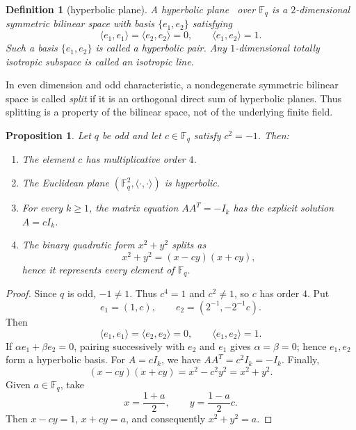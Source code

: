 \documentclass[12pt]{article}
\newtheorem{defn}{Definition}[section]
\newtheorem{prop}[theorem]{Proposition}
\newcommand{\F}{\mathbb{F}}
\begin{document}
\begin{defn}[hyperbolic plane]\label{def:hyp}
{\rm
A hyperbolic plane~\cite{Ser} over $\F_q$ is a $2$-dimensional symmetric bilinear space with basis $\{e_1,e_2\}$ satisfying
\[
\langle e_1,e_1\rangle = \langle e_2,e_2\rangle = 0,
\qquad
\langle e_1,e_2\rangle = 1.
\]
Such a basis \(\{e_1,e_2\}\) is called a hyperbolic pair. Any $1$-dimensional totally isotropic subspace is called an isotropic line.
}
\end{defn}

In even dimension and odd characteristic, a nondegenerate symmetric
bilinear space is called \emph{split} if it is an orthogonal direct sum of
hyperbolic planes. Thus splitting is a property of the bilinear space, not
of the underlying finite field.

\begin{prop}\label{prop:split-consequences}
Let \(q\) be odd and let \(c\in\F_q\) satisfy \(c^2=-1\). Then:
\begin{enumerate}[label=(\roman*)]
\item The element $c$ has multiplicative order $4$.
\item The Euclidean plane $(\F_q^2,\langle \cdot,\cdot\rangle)$ is hyperbolic.
\item For every $k \ge 1$, the matrix equation $AA^T = -I_k$ has the explicit solution $A=cI_k$.
\item The binary quadratic form $x^2+y^2$ splits as
\[
x^2+y^2 = (x-cy)(x+cy),
\]
hence it represents every element of\/ $\F_q$.
\end{enumerate}
\end{prop}

\begin{proof}
Since \(q\) is odd, \(-1\ne1\). Thus \(c^4=1\) and \(c^2\ne1\), so
\(c\) has order \(4\). Put
\[
e_1=(1,c),\qquad e_2=(2^{-1},-2^{-1}c).
\]
Then
\[
\langle e_1,e_1\rangle=\langle e_2,e_2\rangle=0,
\qquad \langle e_1,e_2\rangle=1.
\]
If \(\alpha e_1+\beta e_2=0\), pairing successively with \(e_2\) and
\(e_1\) gives \(\alpha=\beta=0\); hence \(e_1,e_2\) form a hyperbolic
basis. For \(A=cI_k\), we have \(AA^T=c^2I_k=-I_k\). Finally,
\[
(x-cy)(x+cy)=x^2-c^2y^2=x^2+y^2.
\]
Given \(a\in\F_q\), take
\[
x=\frac{1+a}{2},\qquad y=\frac{1-a}{2}c.
\]
Then \(x-cy=1\), \(x+cy=a\), and consequently
\(x^2+y^2=a\).
\end{proof}

\end{document}
